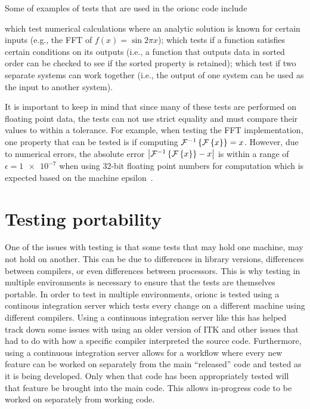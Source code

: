 Some of examples of tests that are used in the \gls{orionc} code include
\begin{enumerate*}[label={}]
	 which test numerical
		calculations where an analytic solution is known
		for certain inputs (e.g., the \acrshort{FFT} of
		\(f(x) = \sin 2\pi{}x\));
	 which tests if a function
		satisfies certain conditions on its outputs (i.e.,
		a function that outputs data in sorted order can
		be checked to see if the sorted property is
		retained);
	 which test if two
		separate systems can work together (i.e., the
		output of one system can be used as the input to
		another system).
\end{enumerate*}

It is important to keep in mind that since many of these tests are
performed on floating point data, the tests can not use strict
equality and must compare their values to within a tolerance. For
example, when testing the FFT implementation, one property that
can be tested is if computing \(\mathcal{F}^{-1}\left\{\mathcal{F}\left\{x\right\}\right\} =
x\). However, due to numerical errors, the absolute error \(\left| \mathcal{F}^{-1}\left\{\mathcal{F}\left\{x\right\}\right\} -
x \right|\) is within a range of \(\epsilon = \num{1e-7}\) when
using 32-bit floating point numbers for
computation which is expected based on the machine epsilon~\autocite{fftw:accuracy-bench,Tashce:FFT-error}.

\section{Testing portability}

One of the issues with testing is that some tests that may hold
one machine, may not hold on another. This can be due to
differences in library versions, differences between compilers, or
even differences between processors. This is why testing in
multiple environments is necessary to ensure that the tests are
themselves portable. In order to test in multiple environments,
\gls{orionc} is tested using a continous integration server which
tests every change on a different machine using different
compilers. Using a continuous integration server like this has
helped track down some issues with using an older version of ITK
and other issues that had to do with how a specific compiler
interpreted the source code.
Furthermore, using a continuous integration server allows for a
workflow where every new feature can be worked on separately from
the main ``released'' code and tested as it is being developed.
Only when that code has been appropriately tested will that
feature be brought into the main code. This allows in-progress
code to be worked on separately from working code.

